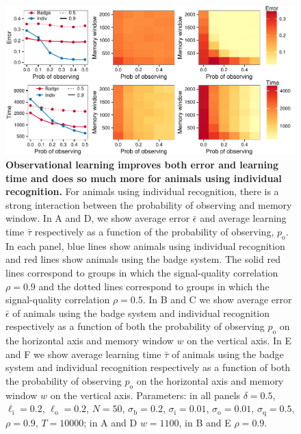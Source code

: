 \begin{figure}
\includegraphics[width=6.85in]{figures/observational_learning.pdf}
\caption{\sffamily\small\textbf{Observational learning improves both error and learning time and does so much more for animals using individual recognition.} For animals using individual recognition, there is a strong interaction between the probability of observing and memory window. In A and D, we show average error $\bar{\epsilon}$ and average learning time $\bar{\tau}$ respectively as a function of the probability of observing, $p_\text{o}$. In each panel, blue lines show animals using individual recognition and red lines show animals using the badge system. The solid red lines correspond to groups in which the signal-quality correlation $\rho=0.9$ and the dotted lines correspond to groups in which the signal-quality correlation $\rho=0.5$. In B and C we show average error $\bar{\epsilon}$ of animals using the badge system and individual recognition respectively as a function of both the probability of observing $p_\text{o}$ on the horizontal axis and memory window $w$ on the vertical axis. In E and F we show average learning time $\bar{\tau}$ of animals using the badge system and individual recognition respectively as a function of both the probability of observing $p_\text{o}$ on the horizontal axis and memory window $w$ on the vertical axis.  Parameters: in all panels $\delta = 0.5$, $\ell_\text{i}=0.2$, $\ell_\text{o}=0.2$, $N=50$, $\sigma_\text{b}=0.2$, $\sigma_\text{i}=0.01$, $\sigma_\text{o}=0.01$, $\sigma_\text{q}=0.5$, $\rho=0.9$, $T=10000$; in A and D $w=1100$, in B and E $\rho=0.9$.}
\label{observational}
\end{figure}

